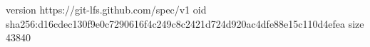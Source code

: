 version https://git-lfs.github.com/spec/v1
oid sha256:d16cdec130f9e0c7290616f4c249c8c2421d724d920ac4dfe88e15c110d4efea
size 43840
